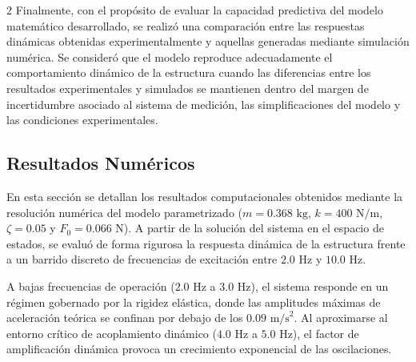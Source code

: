 \documentclass[10pt]{article}
\begin{document}
\begin{multicols}{2}
Finalmente, con el propósito de evaluar la capacidad predictiva del modelo matemático desarrollado, se realizó una comparación entre las respuestas dinámicas obtenidas experimentalmente y aquellas generadas mediante simulación numérica. Se consideró que el modelo reproduce adecuadamente el comportamiento dinámico de la estructura cuando las diferencias entre los resultados experimentales y simulados se mantienen dentro del margen de incertidumbre asociado al sistema de medición, las simplificaciones del modelo y las condiciones experimentales.



\subsection{Resultados Numéricos}

En esta sección se detallan los resultados computacionales obtenidos mediante la resolución numérica del modelo parametrizado ($m = 0.368\text{ kg}$, $k = 400\text{ N/m}$, $\zeta = 0.05$ y $F_0 = 0.066\text{ N}$). A partir de la solución del sistema en el espacio de estados, se evaluó de forma rigurosa la respuesta dinámica de la estructura frente a un barrido discreto de frecuencias de excitación entre $2.0\text{ Hz}$ y $10.0\text{ Hz}$.

A bajas frecuencias de operación ($2.0\text{ Hz}$ a $3.0\text{ Hz}$), el sistema responde en un régimen gobernado por la rigidez elástica, donde las amplitudes máximas de aceleración teórica se confinan por debajo de los $0.09\text{ m/s}^2$. Al aproximarse al entorno crítico de acoplamiento dinámico ($4.0\text{ Hz}$ a $5.0\text{ Hz}$), el factor de amplificación dinámica provoca un crecimiento exponencial de las oscilaciones. 


\end{multicols}
\end{document}
